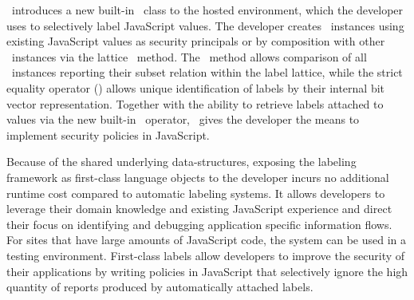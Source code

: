 \FlowCore\ introduces a new built-in \FlowLabelObject\ class to the hosted environment, which the developer uses to selectively label JavaScript values.
The developer creates \FlowLabelObject\ instances using existing JavaScript values as security principals or by composition with other \FlowLabelObject\ instances via the lattice \join\ method.
The \msubsumes\ method allows comparison of all \FlowLabelObject\ instances reporting their subset relation within the label lattice, while the strict equality operator (\code{===}) allows unique identification of labels by their internal bit vector representation.
Together with the ability to retrieve labels attached to values via the new built-in \mlabelof\ operator, \FlowCore\ gives the developer the means to implement security policies in JavaScript.

Because of the shared underlying data-structures, exposing the labeling framework as first-class language objects to the developer incurs no additional runtime cost compared to automatic labeling systems.
It allows developers to leverage their domain knowledge and existing JavaScript experience and direct their focus on identifying and debugging application specific information flows.
For sites that have large amounts of JavaScript code, the system can be used in a testing environment.
First-class labels allow developers to improve the security of their applications by writing policies in JavaScript that selectively ignore the high quantity of reports produced by automatically attached labels.

